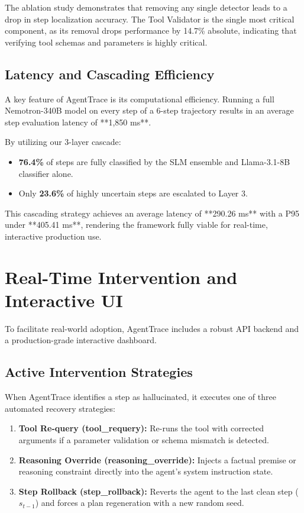 \documentclass[11pt,a4paper]{article}
\begin{document}
The ablation study demonstrates that removing any single detector leads to a drop in step localization accuracy. The Tool Validator is the single most critical component, as its removal drops performance by 14.7\% absolute, indicating that verifying tool schemas and parameters is highly critical.

\subsection{Latency and Cascading Efficiency}
A key feature of AgentTrace is its computational efficiency. Running a full Nemotron-340B model on every step of a 6-step trajectory results in an average step evaluation latency of **1,850 ms**. 

By utilizing our 3-layer cascade:
\begin{itemize}
    \item \textbf{76.4\%} of steps are fully classified by the SLM ensemble and Llama-3.1-8B classifier alone.
    \item Only \textbf{23.6\%} of highly uncertain steps are escalated to Layer 3.
\end{itemize}
This cascading strategy achieves an average latency of **290.26 ms** with a P95 under **405.41 ms**, rendering the framework fully viable for real-time, interactive production use.

\section{Real-Time Intervention and Interactive UI}
To facilitate real-world adoption, AgentTrace includes a robust API backend and a production-grade interactive dashboard.

\subsection{Active Intervention Strategies}
When AgentTrace identifies a step as hallucinated, it executes one of three automated recovery strategies:
\begin{enumerate}
    \item \textbf{Tool Re-query (tool\_requery):} Re-runs the tool with corrected arguments if a parameter validation or schema mismatch is detected.
    \item \textbf{Reasoning Override (reasoning\_override):} Injects a factual premise or reasoning constraint directly into the agent's system instruction state.
    \item \textbf{Step Rollback (step\_rollback):} Reverts the agent to the last clean step ($s_{t-1}$) and forces a plan regeneration with a new random seed.
\end{enumerate}
\end{document}
